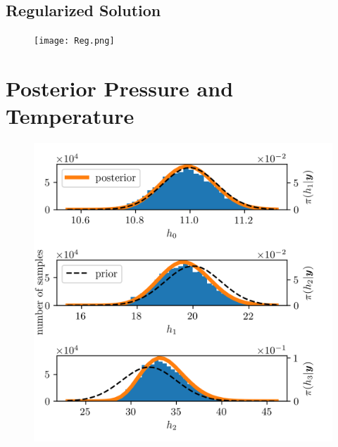 \subsection{Regularized Solution}

\begin{figure}[ht!]
	\centering
	\texttt{[image: Reg.png]}
	\caption[]{}
	\label{fig:}
\end{figure}
\section{Posterior Pressure and Temperature}
\begin{figure}[ht!]
	\centering
	\includegraphics{PHdPTPost0.png}
	\caption[]{}
	\label{fig:}
\end{figure}
